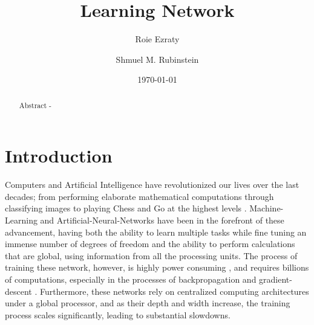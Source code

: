 \documentclass[%
 reprint,
 amsmath,amssymb,
 aps,
]{revtex4-2}
\begin{document}

\title{Learning Network}

\author{Roie Ezraty}
\author{Shmuel M. Rubinstein}%

\date{\today}%

\maketitle

\begin{abstract}

Abstract - 

\end{abstract}

\section{Introduction}\label{sec:Introduction}

    Computers and Artificial Intelligence have revolutionized our lives over the last decades; from performing elaborate mathematical computations through classifying images to playing Chess and Go at the highest levels \cite{baktash2023gpt4reviewadvancementsopportunities}. Machine-Learning and Artificial-Neural-Networks have been in the forefront of these advancement, having both the ability to learn multiple tasks while fine tuning an immense number of degrees of freedom and the ability to perform calculations that are global, using information from all the processing units. 
    The process of training these network, however, is highly power consuming \cite{luccioni2023estimating, mytton2022sources}, and requires billions of computations, especially in the processes of backpropagation and gradient-descent \cite{xie2003equivalence}. Furthermore, these networks rely on centralized computing architectures under a global processor, and as their depth and width increase, the training process scales significantly, leading to substantial slowdowns.
    
\end{document}
